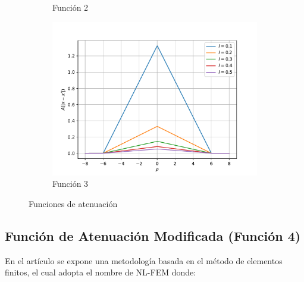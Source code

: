 \begin{figure}
\begin{subfigure}{0.48\textwidth}
        \caption{Función 2}
        \label{fig:atenuacion_completa.f2}
    \end{subfigure}
	\quad
    \begin{subfigure}{0.48\textwidth}
    \centering
        \includegraphics[width=\textwidth]{figuras/conica2dl.pdf}
        \caption{Función 3}
        \label{fig:atenuacion_completa.f3}
    \end{subfigure}
    \caption{Funciones de atenuación}
    \label{fig:atenuacion_completa}
\end{figure}	

\subsection{Función de Atenuación Modificada (Función 4)}

En el artículo  se expone una metodología basada en el método de elementos finitos, el cual adopta el nombre de NL-FEM donde:

